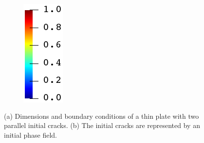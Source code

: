 \begin{figure}[htb!]
\begin{subfigure}[b]{0.07\textwidth}
    \includegraphics[width=\textwidth]{Chapter4/figures/jet_vertical.png}
    \vspace{0.15in}
  \end{subfigure}
  \caption[Dimensions and boundary conditions of a thin plate with two parallel initial cracks.]{(a) Dimensions and boundary conditions of a thin plate with two parallel initial cracks. (b) The initial cracks are represented by an initial phase field.}
  \label{fig: Chapter4/biaxial_schematic}
\end{figure}
